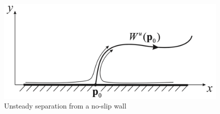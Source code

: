 \documentclass[twoside,10pt,a4paper]{article}
\begin{document}
\begin{figure}[H]
	\centering
	\includegraphics[scale=0.15]{Graphics/Q03D01.png}
	\caption{Unsteady separation from a no-slip wall}
\end{figure}
\end{document}
